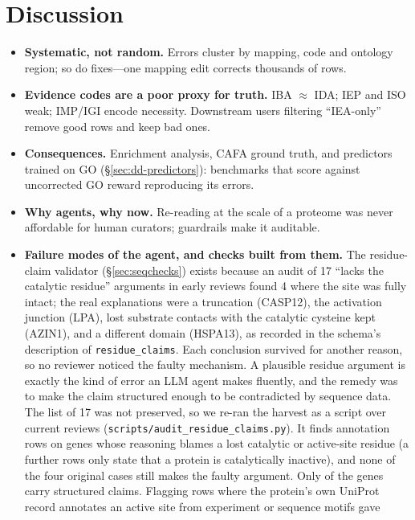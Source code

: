 \section{Discussion}\label{sec:discussion}
\begin{itemize}[nosep]
  \item \textbf{Systematic, not random.} Errors cluster by mapping, code and ontology region;
        so do fixes---one mapping edit corrects thousands of rows.
  \item \textbf{Evidence codes are a poor proxy for truth.} IBA $\approx$ IDA; IEP and ISO weak;
        IMP/IGI encode necessity. Downstream users filtering ``IEA-only'' remove good rows and
        keep bad ones.
  \item \textbf{Consequences.} Enrichment analysis, CAFA ground truth, and predictors trained on GO
        (\S\ref{sec:dd-predictors}): benchmarks that score against uncorrected GO reward reproducing its errors.
  \item \textbf{Why agents, why now.} Re-reading at the scale of a proteome was never affordable
        for human curators; guardrails make it auditable.
  \item \textbf{Failure modes of the agent, and checks built from them.} The residue-claim validator
        (\S\ref{sec:seqchecks}) exists because an audit of 17 ``lacks the catalytic residue'' arguments
        in early reviews found 4 where the site was fully intact; the real explanations were a truncation (CASP12),
        the activation junction (LPA), lost substrate contacts with the catalytic cysteine kept
        (AZIN1), and a different domain (HSPA13), as recorded in the schema's description of
        \texttt{residue\_claims}. Each conclusion survived for another
        reason, so no reviewer noticed the faulty mechanism. A plausible residue argument is exactly
        the kind of error an LLM agent makes fluently, and the remedy was to make the claim
        structured enough to be contradicted by sequence data. The list of 17 was not preserved, so we re-ran the harvest as a script over current reviews
(\texttt{scripts/audit\_residue\_claims.py}). It finds \nAuditRows{} annotation rows on \nAuditGenes{} genes
whose reasoning blames a lost catalytic or active-site residue (a further \nAuditInactiveRows{} rows only state
that a protein is catalytically inactive), and none of the four original cases still makes the faulty
argument. Only \nAuditGenesStructured{} of the \nAuditGenes{} genes carry structured claims. Flagging rows where
the protein's own UniProt record annotates an active site from experiment or sequence motifs gave

\end{itemize}
